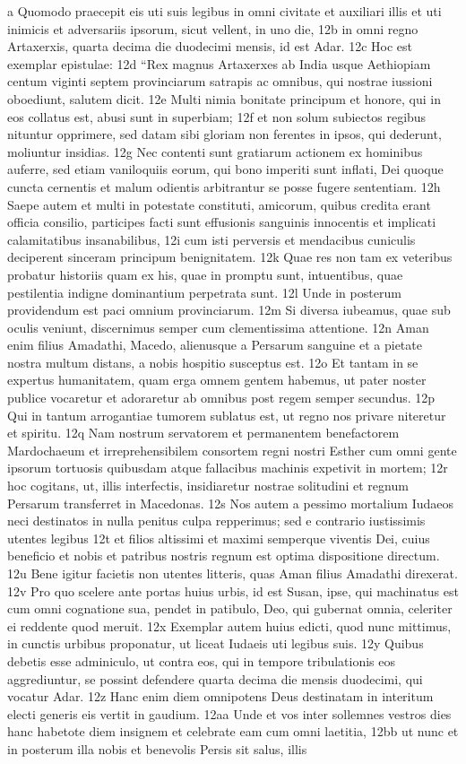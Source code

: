 \begin{biblechapter}
\verse a Quomodo praecepit eis uti suis legibus in omni civitate et auxiliari illis et uti inimicis et adversariis ipsorum, sicut vellent, in uno die, 12b in omni regno Artaxerxis, quarta decima die duodecimi mensis, id est Adar. 12c Hoc est exemplar epistulae: 12d “Rex magnus Artaxerxes ab India usque Aethiopiam centum viginti septem provinciarum satrapis ac omnibus, qui nostrae iussioni oboediunt, salutem dicit. 12e Multi nimia bonitate principum et honore, qui in eos collatus est, abusi sunt in superbiam; 12f et non solum subiectos regibus nituntur opprimere, sed datam sibi gloriam non ferentes in ipsos, qui dederunt, moliuntur insidias.  12g Nec contenti sunt gratiarum actionem ex hominibus auferre, sed etiam vaniloquiis eorum, qui bono imperiti sunt inflati, Dei quoque cuncta cernentis et malum odientis arbitrantur se posse fugere sententiam. 12h Saepe autem et multi in potestate constituti, amicorum, quibus credita erant officia consilio, participes facti sunt effusionis sanguinis innocentis et implicati calamitatibus insanabilibus, 12i cum isti perversis et mendacibus cuniculis deciperent sinceram principum benignitatem. 12k Quae res non tam ex veteribus probatur historiis quam ex his, quae in promptu sunt, intuentibus, quae pestilentia indigne dominantium perpetrata sunt. 12l Unde in posterum providendum est paci omnium provinciarum. 12m Si diversa iubeamus, quae sub oculis veniunt, discernimus semper cum clementissima attentione. 12n Aman enim filius Amadathi, Macedo, alienusque a Persarum sanguine et a pietate nostra multum distans, a nobis hospitio susceptus est. 12o Et tantam in se expertus humanitatem, quam erga omnem gentem habemus, ut pater noster publice vocaretur et adoraretur ab omnibus post regem semper secundus. 12p Qui in tantum arrogantiae tumorem sublatus est, ut regno nos privare niteretur et spiritu. 12q Nam nostrum servatorem et permanentem benefactorem Mardochaeum et irreprehensibilem consortem regni nostri Esther cum omni gente ipsorum tortuosis quibusdam atque fallacibus machinis expetivit in mortem;  12r hoc cogitans, ut, illis interfectis, insidiaretur nostrae solitudini et regnum Persarum transferret in Macedonas. 12s Nos autem a pessimo mortalium Iudaeos neci destinatos in nulla penitus culpa repperimus; sed e contrario iustissimis utentes legibus 12t et filios altissimi et maximi semperque viventis Dei, cuius beneficio et nobis et patribus nostris regnum est optima dispositione directum. 12u Bene igitur facietis non utentes litteris, quas Aman filius Amadathi direxerat. 12v Pro quo scelere ante portas huius urbis, id est Susan, ipse, qui machinatus est cum omni cognatione sua, pendet in patibulo, Deo, qui gubernat omnia, celeriter ei reddente quod meruit. 12x Exemplar autem huius edicti, quod nunc mittimus, in cunctis urbibus proponatur, ut liceat Iudaeis uti legibus suis. 12y Quibus debetis esse adminiculo, ut contra eos, qui in tempore tribulationis eos aggrediuntur, se possint defendere quarta decima die mensis duodecimi, qui vocatur Adar. 12z Hanc enim diem omnipotens Deus destinatam in interitum electi generis eis vertit in gaudium. 12aa Unde et vos inter sollemnes vestros dies hanc habetote diem insignem et celebrate eam cum omni laetitia, 12bb ut nunc et in posterum illa nobis et benevolis Persis sit salus, illis 
\end{biblechapter}
